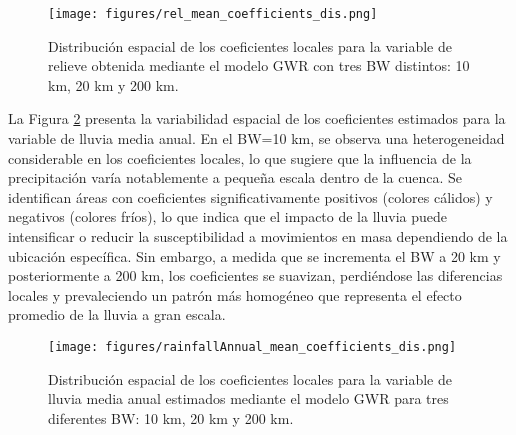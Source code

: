 \documentclass[
  manuscript=article,  
  layout=preprint,  
]{format}
\begin{document}
\begin{figure}[ht!]
    \centering
      {\texttt{[image: figures/rel\_mean\_coefficients\_dis.png]}}
\caption{Distribución espacial de los coeficientes locales para la variable de relieve obtenida mediante el modelo GWR con tres BW distintos: 10 km, 20 km y 200 km.}
    \label{fig:rel_dis}
\end{figure}

La Figura \ref{fig:rainfall_dis} presenta la variabilidad espacial de los coeficientes estimados para la variable de lluvia media anual. En el BW=10 km, se observa una heterogeneidad considerable en los coeficientes locales, lo que sugiere que la influencia de la precipitación varía notablemente a pequeña escala dentro de la cuenca. Se identifican áreas con coeficientes significativamente positivos (colores cálidos) y negativos (colores fríos), lo que indica que el impacto de la lluvia puede intensificar o reducir la susceptibilidad a movimientos en masa dependiendo de la ubicación específica. Sin embargo, a medida que se incrementa el BW a 20 km y posteriormente a 200 km, los coeficientes se suavizan, perdiéndose las diferencias locales y prevaleciendo un patrón más homogéneo que representa el efecto promedio de la lluvia a gran escala.

\begin{figure}[ht!]
    \centering
      {\texttt{[image: figures/rainfallAnnual\_mean\_coefficients\_dis.png]}}
\caption{Distribución espacial de los coeficientes locales para la variable de lluvia media anual estimados mediante el modelo GWR para tres diferentes BW: 10 km, 20 km y 200 km.}
    \label{fig:rainfall_dis}
\end{figure}
\end{document}
